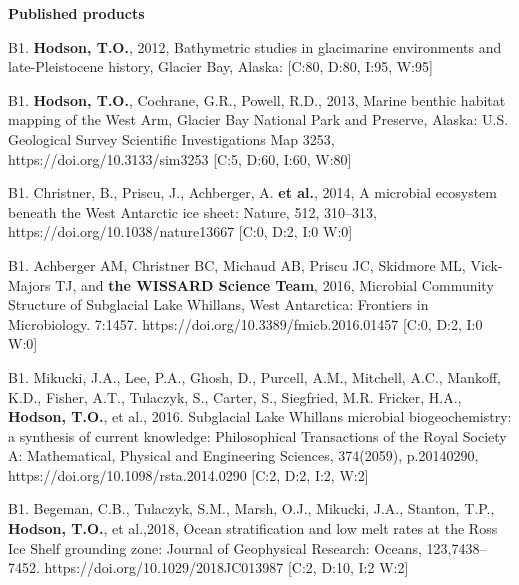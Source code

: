 \documentclass[12pt]{article}
\makeatletter
\def\namedlabel#1#2{\begingroup
	\def\@currentlabel{#2}%
	\label{#1}\endgroup
}
\makeatother
\begin{document}
\vspace{10pt}
\raggedright \textbf{Published products} \\
\vspace{10pt}
	\item[B1.\namedlabel{thesis}{B1}]
    \textbf{Hodson, T.O.},
    2012, Bathymetric studies in glacimarine environments and late-Pleistocene history, Glacier Bay, Alaska:
    [C:80, D:80, I:95, W:95]

	\item[B1.\namedlabel{westarm}{B1}]
    \textbf{Hodson, T.O.}, Cochrane, G.R., Powell, R.D.,
    2013, Marine benthic habitat mapping of the West Arm, Glacier Bay National Park and Preserve, Alaska:
    U.S. Geological Survey Scientific Investigations Map 3253,
    https://doi.org/10.3133/sim3253
    [C:5, D:60, I:60, W:80]

	\item[B1.\namedlabel{wissard2}{B1}] 
    Christner, B., Priscu, J., Achberger, A. \textbf{et al.}, 
    2014, A microbial ecosystem beneath the West Antarctic ice sheet: Nature, 512, 310–313, https://doi.org/10.1038/nature13667
    [C:0, D:2, I:0 W:0]

	\item[B1.\namedlabel{wissard3}{B1}] 
    Achberger AM, Christner BC, Michaud AB, Priscu JC, Skidmore ML, Vick-Majors TJ, and \textbf{the WISSARD Science Team},
    2016, Microbial Community Structure of Subglacial Lake Whillans, West Antarctica: Frontiers in Microbiology. 7:1457.
    https://doi.org/10.3389/fmicb.2016.01457
    [C:0, D:2, I:0 W:0]

	\item[B1.\namedlabel{wissard3}{B1}] 
    Mikucki, J.A., Lee, P.A., Ghosh, D., Purcell, A.M., Mitchell, A.C., Mankoff, K.D., Fisher, A.T., Tulaczyk, S., Carter, S., Siegfried, M.R. Fricker, H.A., \textbf{Hodson, T.O.}, et al.,
    2016. Subglacial Lake Whillans microbial biogeochemistry: a synthesis of current knowledge:
    Philosophical Transactions of the Royal Society A: Mathematical, Physical and Engineering Sciences,
    374(2059), p.20140290,
    https://doi.org/10.1098/rsta.2014.0290
    [C:2, D:2, I:2, W:2]
    
	\item[B1.\namedlabel{wissardX}{B1}]
    Begeman, C.B., Tulaczyk, S.M., Marsh, O.J., Mikucki, J.A., Stanton, T.P., \textbf{Hodson, T.O.}, et al.,2018,
    Ocean stratification and low melt rates at the Ross Ice Shelf grounding zone:
    Journal of Geophysical Research: Oceans, 123,7438–7452. https://doi.org/10.1029/2018JC013987 
    [C:2, D:10, I:2 W:2]
    
\end{document}
